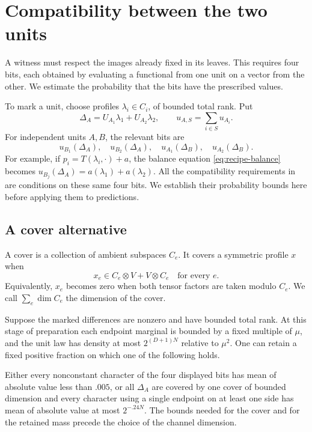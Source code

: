 \section{Compatibility between the two units}\label{sec:phases}

A witness must respect the images already fixed in its leaves. This
requires four bits, each obtained by evaluating a functional from one
unit on a vector from the other. We estimate the probability that the
bits have the prescribed values.

To mark a unit, choose profiles \(\lambda_i\in C_i\), of bounded total
rank. Put
\begin{equation}\label{eq:delta-phase}
 \Delta_A=U_{A_1}\lambda_1+U_{A_2}\lambda_2,
 \qquad u_{A,S}=\sum_{i\in S}u_{A_i}.
\end{equation}
For independent units \(A,B\), the relevant bits are
\[
 u_{B_1}(\Delta_A),\quad u_{B_2}(\Delta_A),\quad
 u_{A_1}(\Delta_B),\quad u_{A_2}(\Delta_B).
\]
For example, if \(p_i=T(\lambda_i,\cdot)+a\), the balance equation
\eqref{eq:recipe-balance} becomes
\(u_{B_j}(\Delta_A)=a(\lambda_1)+a(\lambda_2)\).
All the compatibility requirements in 
are conditions on these same four bits. We establish their probability
bounds here before applying them to predictions.

\subsection{A cover alternative}

A cover is a collection of ambient subspaces \(C_e\). It covers a symmetric
profile \(x\) when
\[
 x_e\in C_e\otimes V+V\otimes C_e\quad\text{for every }e.
\]
Equivalently, \(x_e\) becomes zero when both tensor factors are taken
modulo \(C_e\). We call \(\sum_e\dim C_e\) the dimension of the cover.

\begin{proposition}\label{thm:phase-alternative}
Suppose the marked differences are nonzero and have bounded total rank.
At this stage of preparation each endpoint marginal is bounded by a fixed
multiple of \(\mu\), and the unit law has density at most \(2^{(D+1)N}\)
relative to \(\mu^2\). One can retain a fixed positive fraction on which
one of the following holds.

Either every nonconstant character of the four displayed bits has mean
of absolute value less than \(.005\), or all \(\Delta_A\) are covered by
one cover of bounded dimension and every character using a single
endpoint on at least one side has mean of absolute value at most
\(2^{-.24N}\).
The bounds needed for the cover and for the retained mass precede the
choice of the channel dimension.
\end{proposition}

